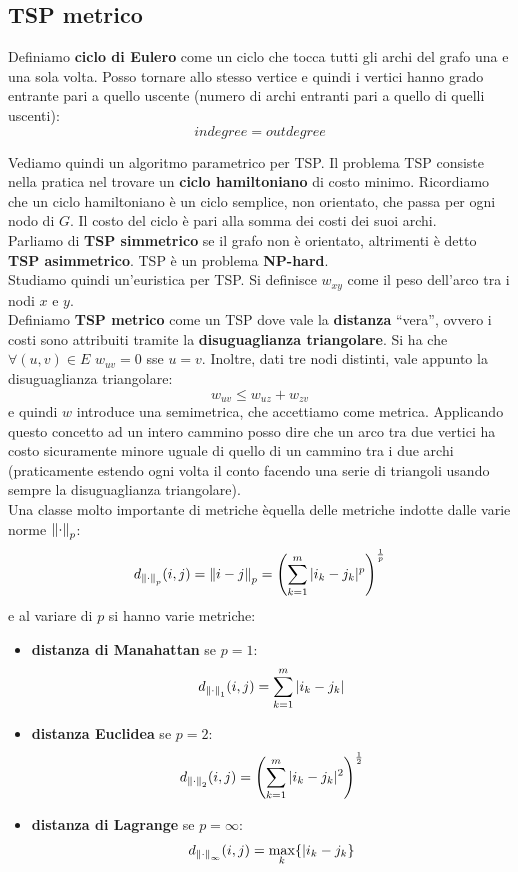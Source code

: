 \documentclass[a4paper,12pt, oneside]{book}
\begin{document}
\subsection{TSP metrico}
\begin{definizione}
 Definiamo \textbf{ciclo di Eulero} come un ciclo che tocca tutti gli archi
  del grafo una e una sola volta. Posso tornare allo stesso vertice e quindi i
  vertici hanno grado entrante pari a quello uscente (numero di archi entranti
  pari a quello di quelli uscenti):
  \[indegree=outdegree\]
\end{definizione}
Vediamo quindi un algoritmo parametrico per TSP. Il problema TSP consiste nella
pratica nel trovare un \textbf{ciclo hamiltoniano} di costo minimo. Ricordiamo
che un ciclo hamiltoniano è un ciclo semplice, non orientato, che passa per ogni
nodo di $G$. Il costo del ciclo è pari alla somma dei costi dei suoi archi.\\ 
Parliamo di \textbf{TSP simmetrico} se il grafo non è orientato, altrimenti è
detto \textbf{TSP asimmetrico}. TSP è un problema \textbf{NP-hard}.\\
Studiamo quindi un'euristica per TSP. Si definisce $w_{xy}$ come il peso
dell'arco tra i nodi $x$ e $y$.\\
Definiamo \textbf{TSP metrico} come un TSP dove vale la \textbf{distanza}
``vera'', ovvero i costi sono attribuiti tramite la \textbf{disuguaglianza
  triangolare}. Si ha che $\forall(u,v)\in E$ $w_{uv}=0$ sse $u=v$. Inoltre,
dati tre nodi distinti, vale appunto la disuguaglianza triangolare:
\[w_{uv}\leq w_{uz}+w_{zv}\]
e quindi $w$ introduce una semimetrica, che accettiamo come metrica.
Applicando questo concetto ad un intero cammino posso dire che un arco tra due
vertici ha costo sicuramente minore uguale di quello di un cammino tra i due
archi (praticamente estendo ogni volta il conto facendo una serie di triangoli
usando sempre la disuguaglianza triangolare).\\
Una classe molto importante di metriche èquella delle metriche indotte dalle
varie norme $\norm{\cdot}_p$:
\[d_{\norm{\cdot}_p}(i,j)=\norm{i-j}_p=\left(\sum_{k=1}^m
    |i_k-j_k|^p\right)^{\frac{1}{p}}\]
e al variare di $p$ si hanno varie metriche:
\begin{itemize}
  \item \textbf{distanza di Manahattan} se $p=1$:
  \[d_{\norm{\cdot}_1}(i,j)=\sum_{k=1}^m|i_k-j_k|\]
  \item \textbf{distanza Euclidea} se $p=2$:
  \[d_{\norm{\cdot}_2}(i,j)=\left(\sum_{k=1}^m
    |i_k-j_k|^2\right)^{\frac{1}{2}}\]
  \item \textbf{distanza di Lagrange} se $p=\infty$:
  \[d_{\norm{\cdot}_\infty}(i,j)=\max_k\{|i_k-j_k\}\]
\end{itemize}
\end{document}

